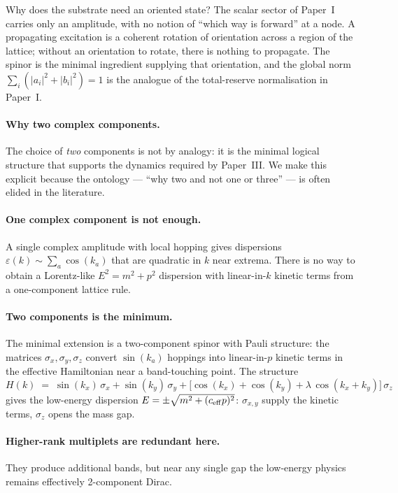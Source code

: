 \documentclass[11pt,a4paper]{article}
\begin{document}
Why does the substrate need an oriented state? The scalar
sector of Paper~I carries only an amplitude, with no notion of
``which way is forward'' at a node. A propagating excitation is
a coherent rotation of orientation across a region of the
lattice; without an orientation to rotate, there is nothing to
propagate. The spinor is the minimal ingredient supplying that
orientation, and the global norm $\sum_i (|a_i|^2 + |b_i|^2) = 1$
is the analogue of the total-reserve normalisation in Paper~I.

\paragraph{Why two complex components.}
The choice of \emph{two} components is not by analogy:
it is the minimal logical structure that supports the dynamics
required by Paper~III. We make this explicit because the
ontology --- ``why two and not one or three'' --- is often
elided in the literature.

\paragraph{One complex component is not enough.}
A single complex amplitude with local hopping gives dispersions
$\varepsilon(k) \sim \sum_a \cos(k_a)$ that are quadratic in
$k$ near extrema. There is no way to obtain a Lorentz-like
$E^2 = m^2 + p^2$ dispersion with linear-in-$k$ kinetic terms
from a one-component lattice rule.

\paragraph{Two components is the minimum.}
The minimal extension is a two-component spinor with Pauli
structure: the matrices $\sigma_x, \sigma_y, \sigma_z$ convert
$\sin(k_a)$ hoppings into linear-in-$p$ kinetic terms in the
effective Hamiltonian near a band-touching point. The structure
\begin{equation}
H(k) \;=\; \sin(k_x)\,\sigma_x + \sin(k_y)\,\sigma_y
+ \big[\cos(k_x) + \cos(k_y) + \lambda\,\cos(k_x + k_y)\big]\,\sigma_z
\label{eq:Hgeneric}
\end{equation}
gives the low-energy dispersion $E = \pm\sqrt{m^2 + (c_{\rm eff} p)^2}$:
$\sigma_{x,y}$ supply the kinetic terms, $\sigma_z$ opens the
mass gap.

\paragraph{Higher-rank multiplets are redundant here.}
They produce additional bands, but near any single gap the
low-energy physics remains effectively 2-component Dirac.
\end{document}
